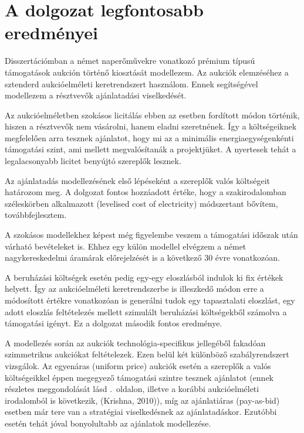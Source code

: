 \documentclass[twoside, magyar, showtrims]{corvinusphd}
\begin{document}
\section{A dolgozat legfontosabb eredményei}

Disszertációmban a német naperőművekre vonatkozó prémium típusú támogatások
aukción történő kiosztását modellezem.
Az aukciók elemzéséhez a sztenderd aukcióelméleti keretrendszert használom.
Ennek segítségével modellezem a résztvevők ajánlatadási viselkedését.

Az aukcióelméletben szokásos licitálás ebben az esetben fordított módon történik,
hiszen a résztvevők nem vásárolni, hanem eladni szeretnének.
Így a költségeiknek megfelelően arra tesznek ajánlatot, hogy mi az a
minimális energiaegységenkénti támogatási szint, ami mellett megvalósítanák a projektjüket.
A nyertesek tehát a legalacsonyabb licitet benyújtó szereplők lesznek.

Az ajánlatadás modellezésének első lépéseként a szereplők valós költségeit határozom
meg. A dolgozat fontos hozzáadott értéke, hogy a szakirodalomban széleskörben
alkalmazott  (levelised cost of electricity)
módszertant bővítem, továbbfejlesztem.

A szokásos modellekhez képest
még figyelembe veszem a támogatási időszak után várható bevételeket is.
Ehhez egy külön modellel elvégzem
a német nagykereskedelmi áramárak előrejelzését is a következő 30 évre vonatkozóan.

A beruházási költségek esetén pedig egy-egy eloszlásból indulok ki fix értékek helyett.
Így az aukcióelméleti keretrendszerbe is illeszkedő módon
erre a módosított  értékre vonatkozóan is  generálni
tudok egy tapasztalati eloszlást, egy adott eloszlás feltételezés
mellett szimulált beruházási költségekből számolva a támogatási igényt.
Ez a dolgozat második fontos eredménye.

A modellezés során az aukciók technológia-specifikus
jellegéből fakadóan szimmetrikus aukciókat feltételezek.
Ezen belül két különböző szabályrendszert vizsgálok.
Az egyenáras (uniform price) aukciók esetén a szereplők
a valós költségeikkel éppen megegyező támogatási szintre tesznek ajánlatot
(ennek részletes meggondolását lásd \pageref{uniform}.~oldalon, 
illetve a korábbi aukcióelméleti irodalomból is következik,
(Krishna, 2010)), míg az ajánlatiáras (pay-as-bid) esetben már tere van
a stratégiai viselkedésnek az ajánlatadáskor. 
Ezutóbbi esetén tehát jóval bonyolultabb az ajánlatok modellezése.
\end{document}
